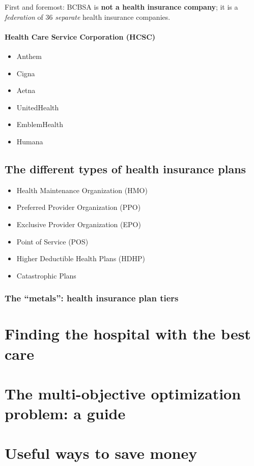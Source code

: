 \documentclass{article}
\begin{document}
First and foremost: BCBSA is {\bf not a health insurance company}; it is a {\it federation} of 36 {\it separate} health insurance companies.

\paragraph{Health Care Service Corporation (HCSC)}

\begin{itemize}
\item Anthem
\item Cigna
\item Aetna
\item UnitedHealth
\item EmblemHealth
\item Humana
\end{itemize}

\subsection{The different types of health insurance plans}

\begin{itemize}
\item Health Maintenance Organization (HMO)
\item Preferred Provider Organization (PPO)
\item Exclusive Provider Organization (EPO)
\item Point of Service (POS)
\item Higher Deductible Health Plans (HDHP)
\item Catastrophic Plans
\end{itemize}

\subsubsection{The ``metals'': health insurance plan tiers}

\section{Finding the hospital with the best care}

\section{The multi-objective optimization problem: a guide}

\section{Useful ways to save money}

\printbibliography
\end{document}
